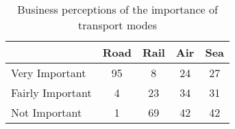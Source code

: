 \begin{table}[h]
\centering 
\begin{longtable}{lcccc}
\hline
	& \textbf{Road} & \textbf{Rail} & \textbf{Air} & \textbf{Sea}\\ 
\hline
 Very Important & 95 & 8 & 24 & 27 \\
 Fairly Important & 4 & 23 & 34 & 31	\\
 Not Important & 1& 69 & 42 & 42	\\
\hline
\end{longtable}
\caption{Business perceptions of the importance of transport modes}  
\label{tab:transport_modes}
\end{table}
